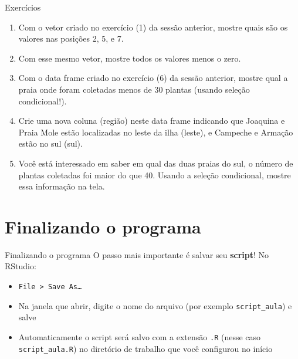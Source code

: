 \documentclass[10pt,handout]{beamer}\usepackage{graphicx, color}
\begin{document}
\begin{frame}[fragile=singleslide]{Exercícios}
  \begin{enumerate}
  \item Com o vetor criado no exercício (1) da sessão anterior, mostre
    quais são os valores nas posições 2, 5, e 7.
  \item Com esse mesmo vetor, mostre todos os valores menos o zero.
  \item Com o data frame criado no exercício (6) da sessão anterior,
    mostre qual a praia onde foram coletadas menos de 30 plantas (usando
    seleção condicional!).
  \item Crie uma nova coluna (região) neste data frame indicando que
    Joaquina e Praia Mole estão localizadas no leste da ilha (leste), e
    Campeche e Armação estão no sul (sul).
  \item Você está interessado em saber em qual das duas praias do sul, o
    número de plantas coletadas foi maior do que 40. Usando a seleção
    condicional, mostre essa informação na tela.
  \end{enumerate}
\end{frame}

\section{Finalizando o programa}

\begin{frame}[fragile=singleslide]{Finalizando o programa}
O passo mais importante é salvar seu \textbf{script}! No RStudio:
\begin{itemize}
\item \texttt{File > Save As\ldots}
\item Na janela que abrir, digite o nome do arquivo (por exemplo
  \texttt{script\_aula}) e salve
\item Automaticamente o script será salvo com a extensão \texttt{.R}
  (nesse caso \texttt{script\_aula.R}) no diretório de trabalho que você
  configurou no início
\end{itemize}
\end{frame}
\end{document}

